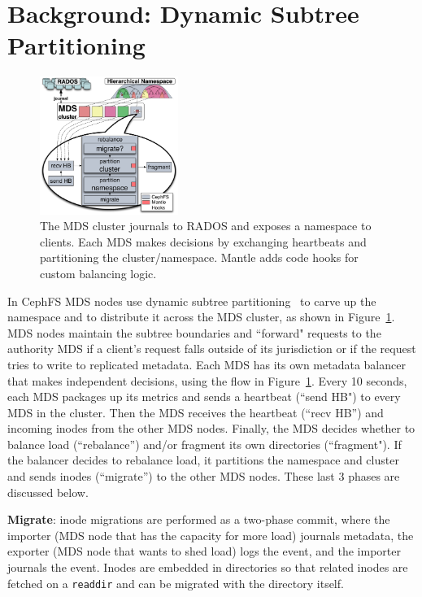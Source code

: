 \section{Background: Dynamic Subtree Partitioning}	%
\label{background_dynamic_subtree_partitioning}			%
\begin{figure}[tb]
	\centering	
	\includegraphics[width=0.4\textwidth]{./chapters/mantle/figures/balancer-diagram.pdf}
 	\caption{The MDS cluster journals to RADOS and exposes a namespace to clients. Each MDS makes decisions by exchanging heartbeats and partitioning the cluster/namespace. Mantle adds code hooks for custom balancing logic.\label{figure:balancer-diagram}}    
\end{figure}   


In CephFS MDS nodes use dynamic subtree partitioning~\cite{weil:sc2004-dyn-metadata} to carve up the namespace and to distribute it across the MDS cluster, as shown in Figure~\ref{figure:balancer-diagram}. MDS nodes maintain the subtree boundaries and ``forward" requests to the authority MDS if a client's request falls outside of its jurisdiction or if the request tries to write to replicated metadata.  Each MDS has its own metadata balancer that makes independent decisions, using the flow in Figure~\ref{figure:balancer-diagram}.  Every 10 seconds, each MDS packages up its metrics and sends a heartbeat (``send HB") to every MDS in the cluster. Then the MDS receives the heartbeat (``recv HB'') and incoming inodes from the other MDS nodes. Finally, the MDS decides whether to balance load (``rebalance'') and/or fragment its own directories (``fragment"). If the balancer decides to rebalance load, it partitions the namespace and cluster and sends inodes (``migrate'') to the other MDS nodes. These last 3 phases are discussed below.

\textbf{Migrate}: inode migrations are performed as a two-phase commit, where the importer (MDS node that has the capacity for more load) journals metadata, the exporter (MDS node that wants to shed load) logs the event, and the importer journals the event. Inodes are embedded in directories so that related inodes are fetched on a \texttt{readdir} and can be migrated with the directory itself.

